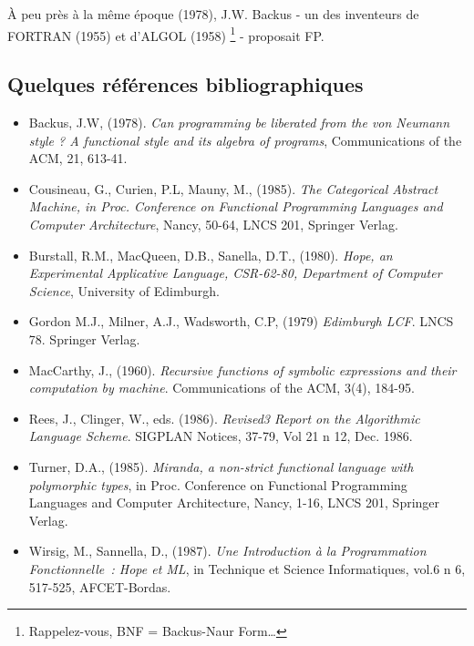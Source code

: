 À peu près à la même époque (1978), J.W. Backus - un des inventeurs de
FORTRAN (1955) et d'ALGOL (1958)
\footnote{Rappelez-vous, BNF = Backus-Naur Form\ldots}
- proposait FP.

\subsection*{Quelques références bibliographiques}
\begin{itemize}
\item Backus, J.W, (1978). 
{\em Can programming be liberated from the von Neumann style ? A
functional style and its algebra of programs}, Communications of the
ACM, 21, 613-41.

\item Cousineau, G., Curien, P.L, Mauny, M., (1985).
{\em The Categorical Abstract Machine, in Proc. Conference on
Functional Programming Languages and Computer Architecture}, Nancy,
50-64, LNCS 201, Springer Verlag.

\item Burstall, R.M., MacQueen, D.B., Sanella, D.T., (1980). 
{\em Hope, an Experimental Applicative Language, CSR-62-80, Department
of Computer Science}, University of Edimburgh.

\item  Gordon M.J., Milner, A.J., Wadsworth, C.P, (1979)
{\em  Edimburgh LCF}. LNCS 78. Springer Verlag.

\item MacCarthy, J., (1960). 
{\em Recursive functions of symbolic expressions and their computation
by machine}. Communications of the ACM, 3(4), 184-95.

\item Rees, J., Clinger, W., eds. (1986). {\em Revised3 Report on the Algorithmic Language Scheme}.  SIGPLAN Notices, 37-79, Vol 21 n 12, Dec. 1986.

\item Turner, D.A., (1985). {\em Miranda, a non-strict functional language with polymorphic types}, in Proc. Conference on Functional Programming Languages and Computer Architecture, Nancy, 1-16, LNCS 201, Springer Verlag.

\item Wirsig, M., Sannella, D., (1987). 
{\em Une Introduction à la Programmation Fonctionnelle~: Hope et ML},
in Technique et Science Informatiques, vol.6 n 6, 517-525,
AFCET-Bordas.
\end{itemize}

